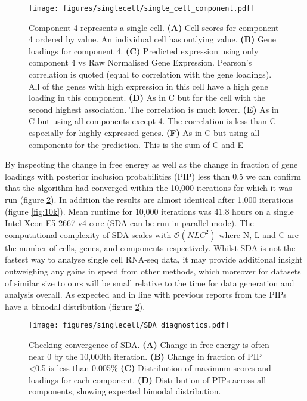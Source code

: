 \begin{figure}[H]
	\centering
	\texttt{[image: figures/singlecell/single\_cell\_component.pdf]}
	\caption[A Single Cell Component]{Component 4 represents a single cell.
		\textbf{(A)} Cell scores for component 4 ordered by value. An individual cell has outlying value.
		\textbf{(B)} Gene loadings for component 4.
		\textbf{(C)} Predicted expression using only component 4 vs Raw Normalised Gene Expression. Pearson's correlation is quoted (equal to correlation with the gene loadings). All of the genes with high expression in this cell have a high gene loading in this component.
		\textbf{(D)} As in C but for the cell with the second highest association. The correlation is much lower. 
		\textbf{(E)} As in C but using all components except 4. The correlation is less than C especially for highly expressed genes.
		\textbf{(F)} As in C but using all components for the prediction. This is the sum of C and E
	}
	\label{fig:single_cell_component}
\end{figure}


By inspecting the change in free energy as well as the change in fraction of gene loadings with posterior inclusion probabilities (PIP) less than 0.5 we can confirm that the algorithm had converged within the 10,000 iterations for which it was run (figure \ref{fig:SDA_diagnostics}). In addition the results are almost identical after 1,000 iterations (figure \ref{fig:10k}). Mean runtime for 10,000 iterations was 41.8 hours on a single Intel Xeon E5-2667 v4 core (SDA can be run in parallel mode). The computational complexity of SDA scales with $\mathcal{O}(NLC^2)$ where N, L and C are the number of cells, genes, and components respectively. Whilst SDA is not the fastest way to analyse single cell RNA-seq data, it may provide additional insight outweighing any gains in speed from other methods, which moreover for datasets of similar size to ours will be small relative to the time for data generation and analysis overall. As expected and in line with previous reports from \cite{Hore2016Tensor} the PIPs have a bimodal distribution (figure \ref{fig:SDA_diagnostics}).

\begin{figure}[H]
	\centering
	\texttt{[image: figures/singlecell/SDA\_diagnostics.pdf]}
	\caption[SDA Convergence]{Checking convergence of SDA.
		\textbf{(A)} Change in free energy is often near 0 by the 10,000th iteration.
		\textbf{(B)} Change in fraction of PIP <0.5 is less than 0.005\%
		\textbf{(C)} Distribution of maximum scores and loadings for each component.
		\textbf{(D)} Distribution of PIPs across all components, showing expected bimodal distribution.}
	\label{fig:SDA_diagnostics}
\end{figure}

